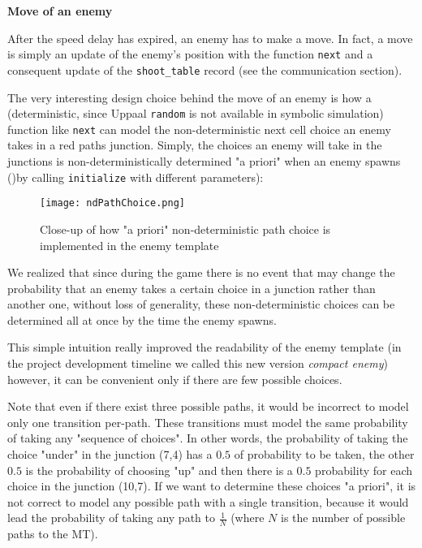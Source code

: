 \documentclass[
10pt, %
a4paper, %
oneside, %
headinclude,footinclude, %
BCOR5mm, %
]{scrartcl}
\begin{document}
				\begin{flushleft}
					\textbf{Move of an enemy}
					
					After the speed delay has expired, an enemy has to make a move. In fact, a move is simply an update of the enemy's position with the function \texttt{next} and a consequent update of the \texttt{shoot\_table} record (see the communication section).
					
					The very interesting design choice behind the move of an enemy is how a (deterministic, since Uppaal \texttt{random} is not available in symbolic simulation) function like \texttt{next} can model the non-deterministic next cell choice an enemy takes in a red paths junction. Simply, the choices an enemy will take in the junctions is non-deterministically determined "a priori" when an enemy spawns ()by calling \texttt{initialize} with different parameters):
					\begin{figure}[h!]
						\centering
						\texttt{[image: ndPathChoice.png]}
						\caption{Close-up of how "a priori" non-deterministic path choice is implemented in the enemy template}
					\end{figure}
					We realized that since during the game there is no event that may change the probability that an enemy takes a certain choice in a junction rather than another one, without loss of generality, these non-deterministic choices can be determined all at once by the time the enemy spawns.
					
					This simple intuition really improved the readability of the enemy template (in the project development timeline we called this new version \emph{compact enemy}) however, it can be convenient only if there are few possible choices.
					
					Note that even if there exist three possible paths, it would be incorrect to model only one transition per-path. These transitions must model the same probability of taking any "sequence of choices". In other words, the probability of taking the choice "under" in the junction (7,4) has a $0.5$ of probability to be taken, the other $0.5$ is the probability of choosing "up" and then there is a $0.5$ probability for each choice in the junction (10,7). If we want to determine these choices "a priori", it is not correct to model any possible path with a single transition, because it would lead the probability of taking any path to $\frac{1}{N}$ (where $N$ is the number of possible paths to the MT).
				\end{flushleft}
\end{document}
